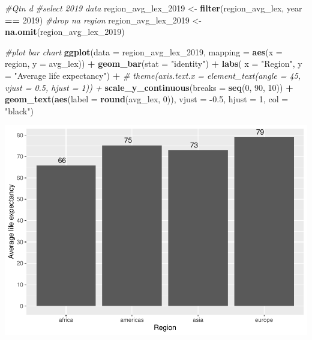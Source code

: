 \documentclass[
]{article}
\newenvironment{Shaded}{\begin{snugshade}}{\end{snugshade}}
\newcommand{\AttributeTok}[1]{\textcolor[rgb]{0.13,0.29,0.53}{#1}}
\newcommand{\CommentTok}[1]{\textcolor[rgb]{0.56,0.35,0.01}{\textit{#1}}}
\newcommand{\DecValTok}[1]{\textcolor[rgb]{0.00,0.00,0.81}{#1}}
\newcommand{\FloatTok}[1]{\textcolor[rgb]{0.00,0.00,0.81}{#1}}
\newcommand{\FunctionTok}[1]{\textcolor[rgb]{0.13,0.29,0.53}{\textbf{#1}}}
\newcommand{\NormalTok}[1]{#1}
\newcommand{\OtherTok}[1]{\textcolor[rgb]{0.56,0.35,0.01}{#1}}
\newcommand{\SpecialCharTok}[1]{\textcolor[rgb]{0.81,0.36,0.00}{\textbf{#1}}}
\newcommand{\StringTok}[1]{\textcolor[rgb]{0.31,0.60,0.02}{#1}}
\begin{document}
\begin{Shaded}
\begin{Highlighting}[]
\CommentTok{\#Qtn d}
\CommentTok{\#select 2019 data}
\NormalTok{region\_avg\_lex\_2019 }\OtherTok{\textless{}{-}} \FunctionTok{filter}\NormalTok{(region\_avg\_lex, year }\SpecialCharTok{==} \DecValTok{2019}\NormalTok{)}
\CommentTok{\#drop na region}
\NormalTok{region\_avg\_lex\_2019 }\OtherTok{\textless{}{-}} \FunctionTok{na.omit}\NormalTok{(region\_avg\_lex\_2019)}

\CommentTok{\#plot bar chart}
\FunctionTok{ggplot}\NormalTok{(}\AttributeTok{data =}\NormalTok{ region\_avg\_lex\_2019, }\AttributeTok{mapping =} \FunctionTok{aes}\NormalTok{(}\AttributeTok{x =}\NormalTok{ region, }\AttributeTok{y =}\NormalTok{ avg\_lex)) }\SpecialCharTok{+}
  \FunctionTok{geom\_bar}\NormalTok{(}\AttributeTok{stat =} \StringTok{"identity"}\NormalTok{) }\SpecialCharTok{+}
  \FunctionTok{labs}\NormalTok{(}
       \AttributeTok{x =} \StringTok{"Region"}\NormalTok{,}
       \AttributeTok{y =} \StringTok{"Average life expectancy"}\NormalTok{) }\SpecialCharTok{+}
  \CommentTok{\# theme(axis.text.x = element\_text(angle = 45, vjust = 0.5, hjust = 1)) +}
  \FunctionTok{scale\_y\_continuous}\NormalTok{(}\AttributeTok{breaks =} \FunctionTok{seq}\NormalTok{(}\DecValTok{0}\NormalTok{, }\DecValTok{90}\NormalTok{, }\DecValTok{10}\NormalTok{)) }\SpecialCharTok{+}
  \FunctionTok{geom\_text}\NormalTok{(}\FunctionTok{aes}\NormalTok{(}\AttributeTok{label =} \FunctionTok{round}\NormalTok{(avg\_lex, }\DecValTok{0}\NormalTok{)), }\AttributeTok{vjust =} \SpecialCharTok{{-}}\FloatTok{0.5}\NormalTok{, }\AttributeTok{hjust =} \DecValTok{1}\NormalTok{, }\AttributeTok{col =} \StringTok{"black"}\NormalTok{)}
\end{Highlighting}
\end{Shaded}

\includegraphics{MTSTIN007_SC_Assingment_2_files/figure-latex/unnamed-chunk-9-1.pdf}
\end{document}
